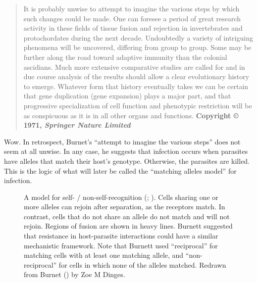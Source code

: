 \documentclass[
  letterpaper,
]{book}
\begin{document}
\begin{quote}
It is probably unwise to attempt to imagine the various steps by which
such changes could be made. One can foresee a period of great research
activity in these fields of tissue fusion and rejection in invertebrates
and protochordates during the next decade. Undoubtedly a variety of
intriguing phenomena will be uncovered, differing from group to group.
Some may be further along the road toward adaptive immunity than the
colonial ascidians. Much more extensive comparative studies are called
for and in due course analysis of the results should allow a clear
evolutionary history to emerge. Whatever form that history eventually
takes we can be certain that gene duplication (gene expansion) plays a
major part, and that progressive specialization of cell function and
phenotypic restriction will be as conspicuous as it is in all other
organs and functions. \textbf{Copyright © 1971, \emph{Springer Nature
Limited}}
\end{quote}

Wow. In retrospect, Burnet's ``attempt to imagine the various steps''
does not seem at all unwise. In any case, he suggests that infection
occurs when parasites have alleles that match their host's genotype.
Otherwise, the parasites are killed. This is the logic of what will
later be called the ``matching alleles model'' for infection.

\begin{figure}


\caption[A model for self- / non-self-recognition]{\label{fig-4.6}A
model for self- / non-self-recognition
(; ). Cells sharing one or more alleles can rejoin after separation,
as the receptors match. In contrast, cells that do not share an allele
do not match and will not rejoin. Regions of fusion are shown in heavy
lines. Burnett suggested that resistance in host-parasite interactions
could have a similar mechanistic framework. Note that Burnett used
``reciprocal'' for matching cells with at least one matching allele, and
``non-reciprocal'' for cells in which none of the alleles matched.
Redrawn from Burnet () by Zoe M Dinges.}

\end{figure}%
\end{document}
